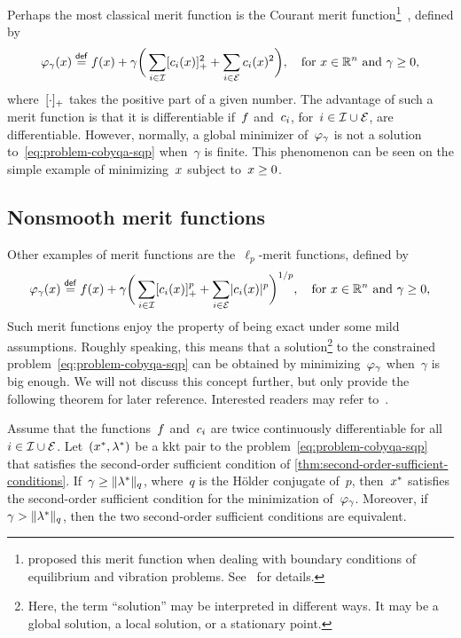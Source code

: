 Perhaps the most classical merit function is the Courant merit function\footnote{\citeauthor{Courant_1943} proposed this merit function when dealing with boundary conditions of equilibrium and vibration problems. See~\cite[Pt.~II, \S~3]{Courant_1943} for details.}~\cite{Courant_1943}, defined by
\begin{equation*}
    \merit_{\gamma}(\iter) \eqdef \obj(\iter) + \gamma \bigg( \sum_{i \in \iub} \posp{\con{i}(\iter)}^2 + \sum_{i \in \ieq} \con{i}(\iter)^2 \bigg), \quad \text{for~$x \in \R^n$ and~$\gamma \ge 0$,}
\end{equation*}
%
where~$[\cdot]_+$ takes the positive part of a given number.
The advantage of such a merit function is that it is differentiable if~$f$ and~$c_{i}$, for~$i \in \mathcal{I} \cup \mathcal{E}$, are differentiable.
However, normally, a global minimizer of~$\merit_{\gamma}$ is not a solution to~\cref{eq:problem-cobyqa-sqp} when~$\gamma$ is finite.
This phenomenon can be seen on the simple example of minimizing~$\iter$ subject to~$\iter \ge 0$.

\subsection{Nonsmooth merit functions}

Other examples of merit functions are the~$\ell_p$-merit functions, defined by
\begin{equation*}
    \merit_{\gamma}(\iter) \eqdef \obj(\iter) + \gamma \bigg( \sum_{i \in \iub} \posp{\con{i}(\iter)}^p + \sum_{i \in \ieq} \abs{\con{i}(\iter)}^p \bigg)^{1/p}, \quad \text{for~$\iter \in \R^n$ and~$\gamma \ge 0$,}
\end{equation*}
Such merit functions enjoy the property of being exact under some mild assumptions.
Roughly speaking, this means that a solution\footnote{Here, the term \enquote{solution} may be interpreted in different ways. It may be a global solution, a local solution, or a stationary point.} to the constrained problem~\cref{eq:problem-cobyqa-sqp} can be obtained by minimizing~$\merit_{\gamma}$ when~$\gamma$ is big enough.
We will not discuss this concept further, but only provide the following theorem for later reference.
Interested readers may refer to~\cite{Han_Mangasarian_1979,Mayne_1980,Pillo_Grippo_1989}.

\begin{theorem}
    \label{thm:exact-merit-function}
    Assume that the functions~$f$ and~$c_{i}$ are twice continuously differentiable for all~$i \in \mathcal{I} \cup \mathcal{E}$.
    Let~$(\iter[\ast], \lm[\ast])$ be a \gls{kkt} pair to the problem~\cref{eq:problem-cobyqa-sqp} that satisfies the second-order sufficient condition of \cref{thm:second-order-sufficient-conditions}.
    If~$\gamma \ge \norm{\lm[\ast]}_q$, where~$q$ is the H{\"{o}}lder conjugate of~$p$, then~$\iter[\ast]$ satisfies the second-order sufficient condition for the minimization of~$\merit_{\gamma}$.
    Moreover, if~$\gamma > \norm{\lm[\ast]}_q$, then the two second-order sufficient conditions are equivalent.
\end{theorem}

